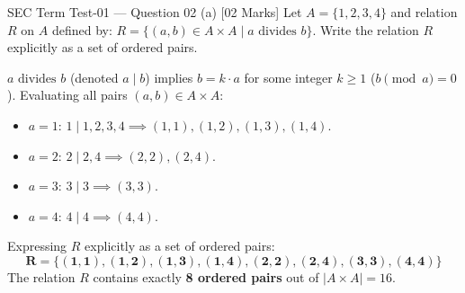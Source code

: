 \documentclass[11pt,a4paper]{article}
\begin{document}
\begin{exambox}[before skip=3pt, after skip=6pt]{SEC Term Test-01 --- Question 02 (a) \hfill [02 Marks]}
\Qlabel
Let $A = \{1, 2, 3, 4\}$ and relation $R$ on $A$ defined by:
$
R = \{(a, b) \in A \times A \mid a \text{ divides } b\}.
$
Write the relation $R$ explicitly as a set of ordered pairs.

\tcblower

\Alabel
$a \text{ divides } b$ (denoted $a \mid b$) implies $b = k \cdot a$ for some integer $k \ge 1$ ($b \pmod{a} = 0$). Evaluating all pairs $(a, b) \in A \times A$:
\begin{itemize}[leftmargin=1.5em, topsep=1pt, itemsep=1pt, parsep=0pt]
    \item $a = 1$: $1 \mid 1, 2, 3, 4 \implies (1, 1), (1, 2), (1, 3), (1, 4)$.
    \item $a = 2$: $2 \mid 2, 4 \implies (2, 2), (2, 4)$.
    \item $a = 3$: $3 \mid 3 \implies (3, 3)$.
    \item $a = 4$: $4 \mid 4 \implies (4, 4)$.
\end{itemize}

\smallskip
Expressing $R$ explicitly as a set of ordered pairs:
\[
\mathbf{R = \big\{ (1, 1), (1, 2), (1, 3), (1, 4), (2, 2), (2, 4), (3, 3), (4, 4) \big\}}
\]
The relation $R$ contains exactly \textbf{8 ordered pairs} out of $|A \times A| = 16$.
\end{exambox}

\vspace{2pt}
\end{document}
